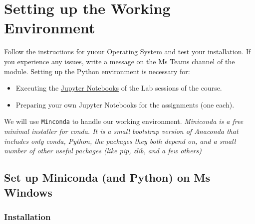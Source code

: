 \documentclass[
  letterpaper,
  DIV=11,
  numbers=noendperiod]{scrreprt}
\providecommand{\tightlist}{%
  \setlength{\itemsep}{0pt}\setlength{\parskip}{0pt}}\usepackage{longtable,booktabs,array}
\begin{document}

\chapter*{Setting up the Working
Environment}\label{setting-up-the-working-environment}


Follow the instructions for yuour Operating System and test your
installation. If you experience any issues, write a message on the Ms
Teams channel of the module. Setting up the Python environment is
necessary for:

\begin{itemize}
\tightlist
\item
  Executing the \href{https://docs.jupyter.org/en/latest/}{Jupyter
  Notebooks} of the Lab sessions of the course.
\item
  Preparing your own Jupyter Notebooks for the assignments (one each).
\end{itemize}

We will use \texttt{Minconda} to handle our working environment.
\emph{Miniconda is a free minimal installer for conda. It is a small
bootstrap version of Anaconda that includes only conda, Python, the
packages they both depend on, and a small number of other useful
packages (like pip, zlib, and a few others)}

\section*{Set up Miniconda (and Python) on Ms
Windows}\label{set-up-miniconda-and-python-on-ms-windows}


\subsection*{Installation}\label{installation}
\end{document}
